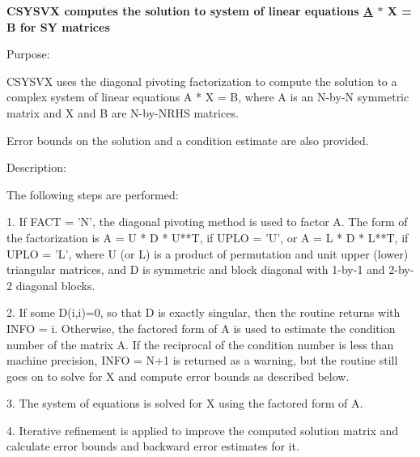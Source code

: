 {\bfseries  C\+S\+Y\+S\+V\+X computes the solution to system of linear equations \hyperlink{classA}{A} $\ast$ X = B for S\+Y matrices} 

 \begin{DoxyParagraph}{Purpose\+: }
\begin{DoxyVerb} CSYSVX uses the diagonal pivoting factorization to compute the
 solution to a complex system of linear equations A * X = B,
 where A is an N-by-N symmetric matrix and X and B are N-by-NRHS
 matrices.

 Error bounds on the solution and a condition estimate are also
 provided.\end{DoxyVerb}
 
\end{DoxyParagraph}
\begin{DoxyParagraph}{Description\+: }
\begin{DoxyVerb} The following steps are performed:

 1. If FACT = 'N', the diagonal pivoting method is used to factor A.
    The form of the factorization is
       A = U * D * U**T,  if UPLO = 'U', or
       A = L * D * L**T,  if UPLO = 'L',
    where U (or L) is a product of permutation and unit upper (lower)
    triangular matrices, and D is symmetric and block diagonal with
    1-by-1 and 2-by-2 diagonal blocks.

 2. If some D(i,i)=0, so that D is exactly singular, then the routine
    returns with INFO = i. Otherwise, the factored form of A is used
    to estimate the condition number of the matrix A.  If the
    reciprocal of the condition number is less than machine precision,
    INFO = N+1 is returned as a warning, but the routine still goes on
    to solve for X and compute error bounds as described below.

 3. The system of equations is solved for X using the factored form
    of A.

 4. Iterative refinement is applied to improve the computed solution
    matrix and calculate error bounds and backward error estimates
    for it.\end{DoxyVerb}
 
\end{DoxyParagraph}

